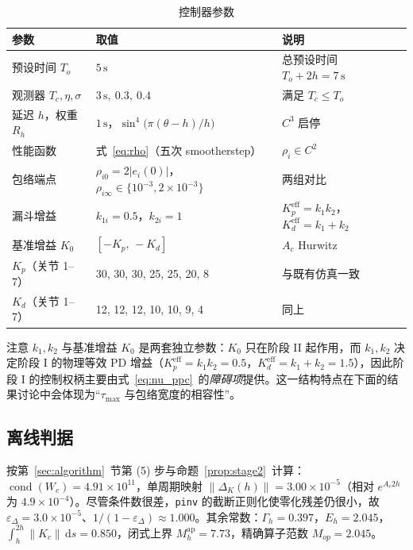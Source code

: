 \begin{table}[H]
\centering
\caption{控制器参数}
\label{tab:sim_params}
\small\begin{tabular}{p{3.2cm}p{5.4cm}p{4.6cm}}
\toprule
参数 & 取值 & 说明 \\
\midrule
预设时间 \(T_o\) & \(5\,\mathrm s\) & 总预设时间 \(T_o+2h=7\,\mathrm s\) \\
观测器 \(T_c,\eta,\sigma\) & \(3\,\mathrm s,\ 0.3,\ 0.4\) & 满足 \(T_c\le T_o\) \\
延迟 \(h\)，权重 \(R_h\) & \(1\,\mathrm s\)，\(\sin^4\!\bigl(\pi(\theta-h)/h\bigr)\) & \(C^{3}\) 启停 \\
性能函数 & 式~\eqref{eq:rho}（五次 smootherstep） & \(\rho_i\in C^{2}\) \\
包络端点 & \(\rho_{i0}=2\lvert e_i(0)\rvert\)，\(\rho_{i\infty}\in\{10^{-3},2\times10^{-3}\}\) & 两组对比 \\
漏斗增益 & \(k_{1i}=0.5\)，\(k_{2i}=1\) & \(K_p^{\mathrm{eff}}=k_1k_2\)，\(K_d^{\mathrm{eff}}=k_1+k_2\) \\
基准增益 \(K_0\) & \([-K_p,\,-K_d]\) & \(A_c\) Hurwitz \\
\(K_p\)（关节 1--7） & 30, 30, 30, 25, 25, 20, 8 & 与既有仿真一致 \\
\(K_d\)（关节 1--7） & 12, 12, 12, 10, 10, 9, 4 & 同上 \\
\bottomrule
\end{tabular}
\end{table}

注意 \(k_1,k_2\) 与基准增益 \(K_0\) 是两套独立参数：\(K_0\) 只在阶段 II 起作用，而 \(k_1,k_2\) 决定阶段 I 的物理等效 PD 增益（\(K_p^{\mathrm{eff}}=k_1k_2=0.5\)，\(K_d^{\mathrm{eff}}=k_1+k_2=1.5\)），因此阶段 I 的控制权柄主要由式~\eqref{eq:nu_ppc}~的\emph{障碍项}提供。这一结构特点在下面的结果讨论中会体现为“\(\tau_{\max}\) 与包络宽度的相容性”。

\subsection{离线判据}
\label{sec:sim_offline}

按第~\ref{sec:algorithm}~节第 (5) 步与命题~\ref{prop:stage2}~计算：\(\operatorname{cond}(W_c)=4.91\times10^{11}\)，单周期映射 \(\lVert\Delta_K(h)\rVert=3.00\times10^{-5}\)（相对 \(e^{A_c2h}\) 为 \(4.9\times10^{-4}\)）。尽管条件数很差，\texttt{pinv} 的截断正则化使零化残差仍很小，故 \(\varepsilon_\Delta=3.0\times10^{-5}\)、\(1/(1-\varepsilon_\Delta)\approx1.000\)。其余常数：\(\Gamma_h=0.397\)，\(E_h=2.045\)，\(\int_h^{2h}\lVert K_c\rVert\,\mathrm ds=0.850\)，闭式上界 \(M_h^{\mathrm{ap}}=7.73\)，精确算子范数 \(M_{op}=2.045\)。


